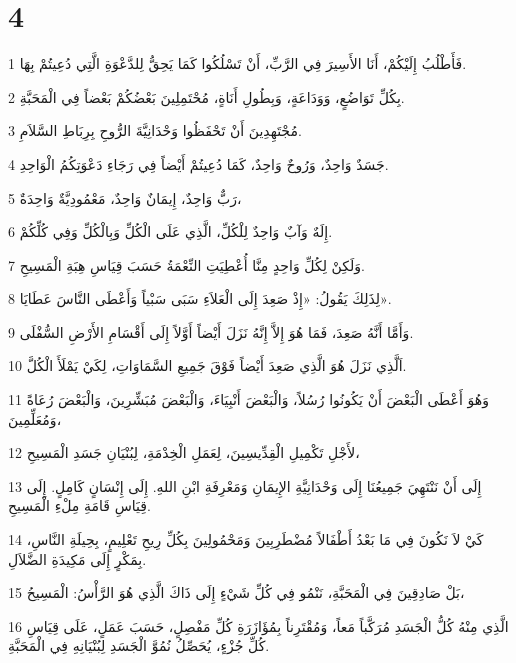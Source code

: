\chapter{4}

\par 1 فَأَطْلُبُ إِلَيْكُمْ، أَنَا الأَسِيرَ فِي الرَّبِّ، أَنْ تَسْلُكُوا كَمَا يَحِقُّ لِلدَّعْوَةِ الَّتِي دُعِيتُمْ بِهَا.
\par 2 بِكُلِّ تَوَاضُعٍ، وَوَدَاعَةٍ، وَبِطُولِ أَنَاةٍ، مُحْتَمِلِينَ بَعْضُكُمْ بَعْضاً فِي الْمَحَبَّةِ.
\par 3 مُجْتَهِدِينَ أَنْ تَحْفَظُوا وَحْدَانِيَّةَ الرُّوحِ بِرِبَاطِ السَّلاَمِ.
\par 4 جَسَدٌ وَاحِدٌ، وَرُوحٌ وَاحِدٌ، كَمَا دُعِيتُمْ أَيْضاً فِي رَجَاءِ دَعْوَتِكُمُ الْوَاحِدِ.
\par 5 رَبٌّ وَاحِدٌ، إِيمَانٌ وَاحِدٌ، مَعْمُودِيَّةٌ وَاحِدَةٌ،
\par 6 إِلَهٌ وَآبٌ وَاحِدٌ لِلْكُلِّ، الَّذِي عَلَى الْكُلِّ وَبِالْكُلِّ وَفِي كُلِّكُمْ.
\par 7 وَلَكِنْ لِكُلِّ وَاحِدٍ مِنَّا أُعْطِيَتِ النِّعْمَةُ حَسَبَ قِيَاسِ هِبَةِ الْمَسِيحِ.
\par 8 لِذَلِكَ يَقُولُ: «إِذْ صَعِدَ إِلَى الْعَلاَءِ سَبَى سَبْياً وَأَعْطَى النَّاسَ عَطَايَا».
\par 9 وَأَمَّا أَنَّهُ صَعِدَ، فَمَا هُوَ إِلاَّ إِنَّهُ نَزَلَ أَيْضاً أَوَّلاً إِلَى أَقْسَامِ الأَرْضِ السُّفْلَى.
\par 10 اَلَّذِي نَزَلَ هُوَ الَّذِي صَعِدَ أَيْضاً فَوْقَ جَمِيعِ السَّمَاوَاتِ، لِكَيْ يَمْلَأَ الْكُلَّ.
\par 11 وَهُوَ أَعْطَى الْبَعْضَ أَنْ يَكُونُوا رُسُلاً، وَالْبَعْضَ أَنْبِيَاءَ، وَالْبَعْضَ مُبَشِّرِينَ، وَالْبَعْضَ رُعَاةً وَمُعَلِّمِينَ،
\par 12 لأَجْلِ تَكْمِيلِ الْقِدِّيسِينَ، لِعَمَلِ الْخِدْمَةِ، لِبُنْيَانِ جَسَدِ الْمَسِيحِ،
\par 13 إِلَى أَنْ نَنْتَهِيَ جَمِيعُنَا إِلَى وَحْدَانِيَّةِ الإِيمَانِ وَمَعْرِفَةِ ابْنِ اللهِ. إِلَى إِنْسَانٍ كَامِلٍ. إِلَى قِيَاسِ قَامَةِ مِلْءِ الْمَسِيحِ.
\par 14 كَيْ لاَ نَكُونَ فِي مَا بَعْدُ أَطْفَالاً مُضْطَرِبِينَ وَمَحْمُولِينَ بِكُلِّ رِيحِ تَعْلِيمٍ، بِحِيلَةِ النَّاسِ، بِمَكْرٍ إِلَى مَكِيدَةِ الضَّلاَلِ.
\par 15 بَلْ صَادِقِينَ فِي الْمَحَبَّةِ، نَنْمُو فِي كُلِّ شَيْءٍ إِلَى ذَاكَ الَّذِي هُوَ الرَّأْسُ: الْمَسِيحُ،
\par 16 الَّذِي مِنْهُ كُلُّ الْجَسَدِ مُرَكَّباً مَعاً، وَمُقْتَرِناً بِمُؤَازَرَةِ كُلِّ مَفْصِلٍ، حَسَبَ عَمَلٍ، عَلَى قِيَاسِ كُلِّ جُزْءٍ، يُحَصِّلُ نُمُوَّ الْجَسَدِ لِبُنْيَانِهِ فِي الْمَحَبَّةِ.
